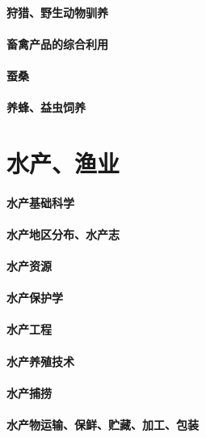 \documentclass[UTF8]{../ApplicationUniverse}
\begin{document}
\subsubsection{狩猎、野生动物驯养}
\subsubsection{畜禽产品的综合利用}
\subsubsection{蚕桑}
\subsubsection{养蜂、益虫饲养}







\chapter{水产、渔业}
\subsubsection{水产基础科学}
\subsubsection{水产地区分布、水产志}
\subsubsection{水产资源}
\subsubsection{水产保护学}
\subsubsection{水产工程}
\subsubsection{水产养殖技术}
\subsubsection{水产捕捞}
\subsubsection{水产物运输、保鲜、贮藏、加工、包装}
\end{document}
